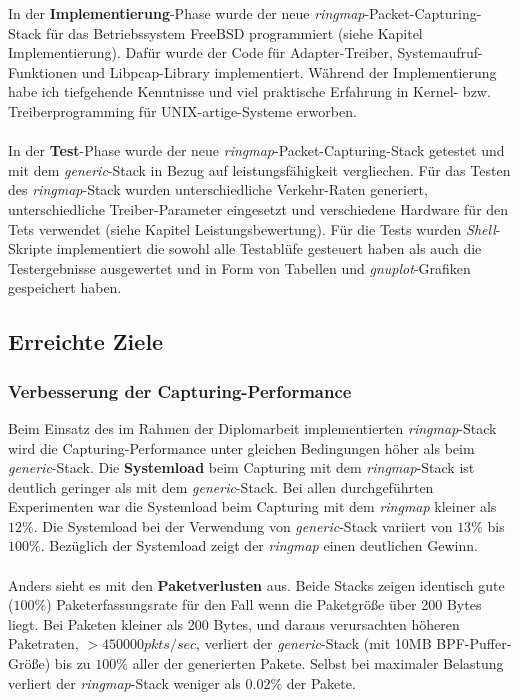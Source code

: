 %
In der \textbf{Implementierung}-Phase wurde der neue
\emph{ringmap}-Packet-Capturing-Stack für das Betriebssystem FreeBSD
programmiert (siehe Kapitel Implementierung). Dafür wurde der Code für
Adapter-Treiber, Systemaufruf-Funktionen und Libpcap-Library implementiert.
Während der Implementierung  habe ich tiefgehende Kenntnisse und viel
praktische Erfahrung in  Kernel- bzw. Treiberprogramming für
UNIX-artige-Systeme erworben.  \\\\
%
In der \textbf{Test}-Phase wurde der neue \emph{ringmap}-Packet-Capturing-Stack
getestet und mit dem \emph{generic}-Stack in Bezug auf leistungsfähigkeit
vergliechen. Für das Testen des \emph{ringmap}-Stack wurden unterschiedliche
Verkehr-Raten generiert, unterschiedliche Treiber-Parameter eingesetzt und
verschiedene Hardware für den Tets verwendet (siehe Kapitel
Leistungsbewertung). Für die Tests wurden \emph{Shell}-Skripte implementiert
die sowohl alle Testablüfe gesteuert haben als auch die Testergebnisse
ausgewertet und in Form von Tabellen und \emph{gnuplot}-Grafiken gespeichert
haben. 

\subsection{Erreichte Ziele}

\subsubsection{Verbesserung der Capturing-Performance}
Beim Einsatz des im Rahmen der Diplomarbeit implementierten
\emph{ringmap}-Stack wird die Capturing-Performance unter gleichen Bedingungen
höher als beim \emph{generic}-Stack. Die \textbf{Systemload} beim Capturing mit
dem \emph{ringmap}-Stack ist deutlich geringer als mit dem \emph{generic}-Stack.
Bei allen durchgeführten Experimenten war die Systemload beim Capturing mit dem
\emph{ringmap} kleiner als $12\%$. Die Systemload bei der Verwendung von
\emph{generic}-Stack variiert von $13\%$ bis $100\%$. Bezüglich der
Systemload zeigt der \emph{ringmap} einen deutlichen Gewinn.\\\\
%
Anders sieht es mit den \textbf{Paketverlusten} aus. Beide Stacks zeigen
identisch gute ($100\%$) Paketerfassungsrate für den Fall wenn die Paketgröße
über 200 Bytes liegt. Bei Paketen kleiner als 200 Bytes, und daraus
verursachten höheren Paketraten, $> 450000 pkts/sec$, verliert der
\emph{generic}-Stack (mit 10MB BPF-Puffer-Größe) bis zu $100\%$ aller der
generierten Pakete. Selbst bei maximaler Belastung verliert der \emph{ringmap}-Stack 
weniger als $0.02\%$ der Pakete.


